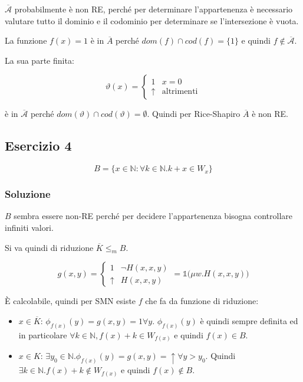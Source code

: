 $\overline{\mathcal{A}}$ probabilmente è non RE, perché per determinare l'appartenenza è necessario valutare tutto il dominio e il codominio per determinare se l'intersezione è vuota.

La funzione $f(x) = 1$ è in $\overline{A}$ perché $dom(f) \cap cod(f) = \{1\}$ e quindi $f \notin \overline{\mathcal{A}}$.

La sua parte finita:

$$
\vartheta(x) = \begin{cases}
1 & x = 0 \\
\uparrow &\text{altrimenti}
\end{cases}
$$

è in $\overline{\mathcal{A}}$ perché $dom(\vartheta) \cap cod(\vartheta) = \emptyset$. Quindi per Rice-Shapiro $\overline{A}$ è non RE. 

\subsection{Esercizio 4}

$$
B = \{ x \in \mathbb{N} : \forall k \in \mathbb{N}. k+x \in W_x \}
$$

\subsubsection{Soluzione}

$B$ sembra essere non-RE perché per decidere l'appartenenza bisogna controllare infiniti valori.

Si va quindi di riduzione $\overline{K} \leq_m B$.

$$
g(x,y) = \begin{cases}
1 & \neg H(x,x,y) \\
\uparrow & H(x,x,y)
\end{cases} = \mathbb{1} \Big( \mu w. H(x,x,y) \Big)
$$

\`E calcolabile, quindi per SMN esiste $f$ che fa da funzione di riduzione:

\begin{itemize}
	\item $x \in \overline{K}$: $\phi_{f(x)}(y) = g(x,y) = 1 \forall y$. $\phi_{f(x)}(y)$ è quindi sempre definita ed in particolare $\forall k \in \mathbb{N}, f(x) + k \in W_{f(x)}$ e quindi $f(x) \in B$.
	\item $x \in K$: $\exists y_0 \in \mathbb{N} .\phi_{f(x)}(y) = g(x,y) = \uparrow \forall y > y_0$. Quindi $\exists k \in \mathbb{N} . f(x) + k \notin W_{f(x)}$ e quindi $f(x) \notin B$.
\end{itemize}


